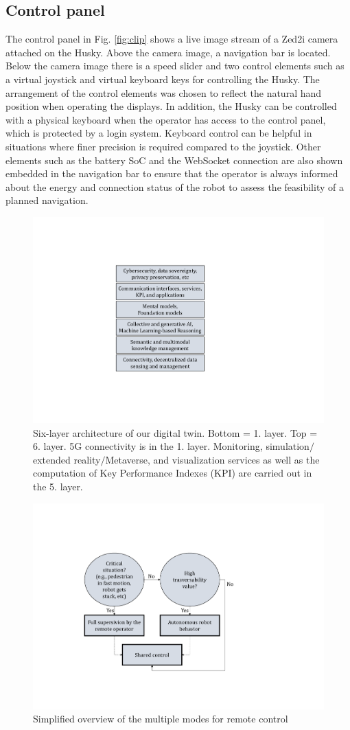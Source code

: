 \documentclass[letterpaper, 10 pt, conference]{ieeeconf}  %
\begin{document}
\subsection{Control panel}
The control panel in Fig. \ref{fig:clip} shows a live image stream of a Zed2i camera attached on the Husky. Above the camera image, a navigation bar is located. 
Below the camera image there is a speed slider and two control elements such as a virtual joystick and virtual keyboard keys for controlling the Husky. The arrangement of the control elements was chosen to reflect the natural hand position when operating the displays.
In addition, the Husky can be controlled with a physical keyboard when the operator has access to the control panel, which is protected by a login system. Keyboard control can be helpful in situations where finer precision is required compared to the joystick.
Other elements such as the battery SoC and the WebSocket connection are also shown embedded in the navigation bar to ensure that the operator is always informed about the energy and connection status of the robot to assess the feasibility of a planned navigation.




\begin{figure}[b]
	\centerline{\includegraphics[width=0.45\columnwidth]{images/DT.pdf}}
	\caption{Six-layer architecture of our digital twin. Bottom = 1. layer. Top = 6. layer. 5G connectivity is in the 1. layer. Monitoring, simulation$\slash$extended reality$\slash$Metaverse, and visualization services as well as the computation of Key Performance Indexes (KPI) are carried out in the 5. layer. }
	\label{fig:DT}
\end{figure}

   \begin{figure}[ht]
	\centerline{\includegraphics[width=0.85\columnwidth]{images/statemachine.pdf}}
	\caption{Simplified overview of the multiple modes for remote control }
	\label{fig:statemachine}
\end{figure}
\end{document}
